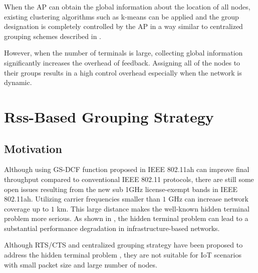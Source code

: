 When the AP can obtain the global information about the location of all nodes, existing clustering algorithms such as k-means can be applied and the group designation is completely controlled by the AP in a way similar to centralized grouping schemes described in \cite{zheng2014performance}.

However, when the number of terminals is large, collecting global information significantly increases the overhead of feedback. Assigning all of the nodes to their groups results in a high control overhead especially when the network is dynamic.


\section{Rss-Based Grouping Strategy}

\subsection{Motivation}

Although using GS-DCF function proposed in IEEE 802.11ah can improve final throughput compared to conventional IEEE 802.11 protocols, there are still some open issues resulting from the new sub 1GHz license-exempt bands in IEEE 802.11ah. Utilizing carrier frequencies smaller than $1$ GHz can increase network coverage up to $1$ km. This large distance makes the well-known hidden terminal problem more serious. As shown in \cite{wu2006wsn02,tsertou2008revisiting,khurana1999performance}, the hidden terminal problem can lead to a substantial performance degradation in infrastructure-based networks. 

Although RTS/CTS and centralized grouping strategy have been proposed to address the hidden terminal problem \cite{yoonregrouping,tseng2014effective}, they are not suitable for IoT scenarios with small packet size and large number of nodes.



